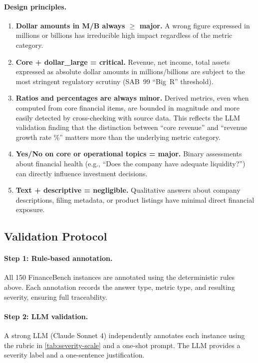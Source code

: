 \paragraph{Design principles.}
\begin{enumerate}
\item \textbf{Dollar amounts in M/B always $\geq$ major.}
    A wrong figure expressed in millions or billions has irreducible
    high impact regardless of the metric category.
\item \textbf{Core + dollar\_large = critical.}
    Revenue, net income, total assets expressed as absolute dollar amounts
    in millions/billions are subject to the most stringent regulatory
    scrutiny (SAB~99 \enquote{Big~R} threshold).
\item \textbf{Ratios and percentages are always minor.}
    Derived metrics, even when computed from core financial items, are
    bounded in magnitude and more easily detected by cross-checking with
    source data. This reflects the LLM validation finding that the
    distinction between \enquote{core revenue} and \enquote{revenue growth rate \%}
    matters more than the underlying metric category.
\item \textbf{Yes/No on core or operational topics = major.}
    Binary assessments about financial health (e.g., \enquote{Does the company
    have adequate liquidity?}) can directly influence investment
    decisions.
\item \textbf{Text + descriptive = negligible.}
    Qualitative answers about company descriptions, filing metadata, or
    product listings have minimal direct financial exposure.
\end{enumerate}

\subsection{Validation Protocol}
\label{sec:validation}

\paragraph{Step 1: Rule-based annotation.}
All 150 FinanceBench instances are annotated using the deterministic
rules above. Each annotation records the answer type, metric type, and
resulting severity, ensuring full traceability.

\paragraph{Step 2: LLM validation.}
A strong LLM (Claude Sonnet 4) independently annotates each instance
using the rubric in \autoref{tab:severity-scale} and a one-shot
prompt. The LLM provides a severity label and a one-sentence
justification.

